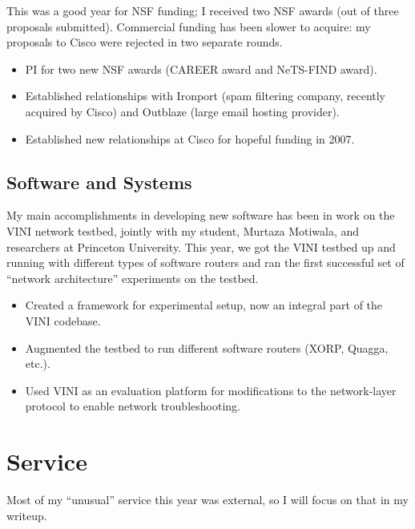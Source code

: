 \begin{sloppypar}
This was a good year for NSF funding; I received two NSF awards (out of
three proposals submitted).  Commercial funding has been slower to
acquire: my proposals to Cisco were rejected in two separate rounds. 

\begin{itemize}
\itemsep=-1pt
\item PI for two new NSF awards (CAREER award and NeTS-FIND award).
\item Established relationships with Ironport (spam filtering
  company, recently acquired by Cisco) and Outblaze (large email hosting
  provider). 
\item Established new relationships at Cisco for hopeful funding in 2007.
\end{itemize}

\subsection*{Software and Systems}

My main accomplishments in developing new software has been in work on
the VINI network testbed, jointly with my student, Murtaza Motiwala, and
researchers at Princeton University.  This year, we got the VINI testbed
up and running with different types of software routers and ran the
first successful set of ``network architecture'' experiments on the
testbed.

\begin{itemize}
\itemsep=-1pt
\item Created a framework for experimental setup, now an integral part of
  the VINI codebase.
\item Augmented the testbed to run different software routers (XORP,
  Quagga, etc.).
\item Used VINI as an evaluation platform for modifications to the
  network-layer protocol to enable network troubleshooting.
\end{itemize}

\section*{Service}

Most of my ``unusual'' service this year was external, so I will focus
on that in my writeup.


\end{sloppypar}
